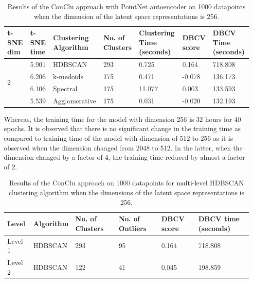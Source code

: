 \begin{table}[H]
  \setlength\extrarowheight{10pt}
  \caption{Results of the ConClu approach with PointNet autoencoder on 1000 datapoints when the dimension of the latent space representations is 256. }
  \centering
  \begin{tabular}{|p{30pt}|p{50pt}|p{60pt}|p{50pt}|p{50pt}|p{50pt}|p{40pt}|}
    \toprule
    \ac{t-SNE} dim	& \ac{t-SNE} time & Clustering Algorithm & No. of Clusters & Clustering Time (seconds) & \ac{DBCV} score & \ac{DBCV} Time (seconds)\\
    \midrule
    \multirow{4}{30pt}{2}	& 5.901 & \ac{HDBSCAN}	& 293	& 0.725 & 0.164	& 718.808 \\ \cline{2-7} 
    & 6.206 & k-medoids	& 175	& 0.471	& -0.078	& 136.173 \\ \cline{2-7} 
    & 6.106 & Spectral	& 175	& 11.077 & 0.003	& 133.593 \\ \cline{2-7}
    & 5.539 & Agglomerative	& 175	& 0.031 & -0.020	& 132.193 \\ 
    \bottomrule
  \end{tabular}
  \label{tab:conclu_256}
\end{table}

Whereas, the training time for the model with dimension 256 is 32 hours for 40 epochs. It is observed that there is no significant change in the training time as compared to training time of the model with dimension of 512 to 256 as it is observed when the dimension changed from 2048 to 512. In the latter, when the dimension changed by a factor of 4, the training time reduced by almost a factor of 2.

\begin{table}[H]
  \setlength\extrarowheight{10pt}
  \caption{Results of the ConClu approach on 1000 datapoints for multi-level \ac{HDBSCAN} clustering algorithm when the dimensions of the latent space representations is 256. }
  \centering
  \begin{tabular}{|l|l|l|l|l|l|}
    \toprule
    Level & Algorithm	& No. of Clusters	& No. of Outliers	& DBCV score	& \ac{DBCV} time (seconds)	\\  
    \midrule
    Level 1 & \ac{HDBSCAN}	& 293	& 95	& 0.164	& 718.808 \\ \cline{1-6}
    Level 2 & \ac{HDBSCAN}	& 122	& 41	& 0.045	& 198.859 \\ 
    \bottomrule
  \end{tabular}
  \label{tab:conclu_256_levels}
\end{table}


